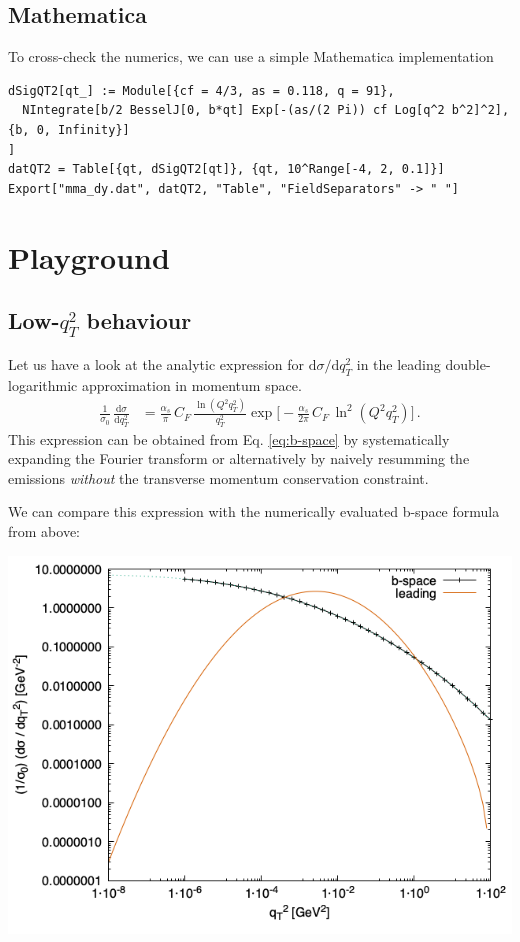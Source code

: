 \documentclass[11pt]{article}
\begin{document}
\subsection{Mathematica}
\label{sec:org34b8f81}
To cross-check the numerics, we can use a simple Mathematica implementation
\begin{verbatim}
dSigQT2[qt_] := Module[{cf = 4/3, as = 0.118, q = 91},
  NIntegrate[b/2 BesselJ[0, b*qt] Exp[-(as/(2 Pi)) cf Log[q^2 b^2]^2], {b, 0, Infinity}]
]
datQT2 = Table[{qt, dSigQT2[qt]}, {qt, 10^Range[-4, 2, 0.1]}]
Export["mma_dy.dat", datQT2, "Table", "FieldSeparators" -> " "]
\end{verbatim}


\section{Playground}
\label{sec:org2b3ed46}

\subsection{Low-\(q_T^2\) behaviour}
\label{sec:orgce81e6a}
Let us have a look at the analytic expression for \(\mathrm{d}\sigma/\mathrm{d}q_T^2\) in the leading double-logarithmic approximation in momentum space.
\begin{align}
  \frac{1}{\sigma_0}\,\frac{\mathrm{d}\sigma}{\mathrm{d}q_T^2}
  &=
  \frac{\alpha_s}{\pi}\, C_F \, \frac{\ln(Q^2 q_T^2)}{q_T^2}
  \exp\Big[
    -\frac{\alpha_s}{2\pi}\, C_F \, \ln^2(Q^2 q_T^2)
  \Big]
  \,.
\end{align}
This expression can be obtained from Eq. \eqref{eq:b-space} by systematically expanding the Fourier transform or alternatively by naively resumming the emissions \emph{without} the transverse momentum conservation constraint.

We can compare this expression with the numerically evaluated b-space formula from above:
\begin{center}
\includegraphics[width=.9\linewidth]{plot_QT2.png}
\end{center}
\end{document}
